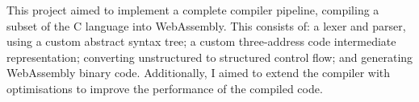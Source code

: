 \documentclass[20-proforma.tex]{subfiles}
\begin{document}
This project aimed to implement a complete compiler pipeline, compiling a subset of the C language into WebAssembly.
This consists of: a lexer and parser, using a custom abstract syntax tree; a custom three-address code intermediate representation; converting unstructured to structured control flow; and generating WebAssembly binary code.
Additionally, I aimed to extend the compiler with optimisations to improve the performance of the compiled code.
\end{document}
